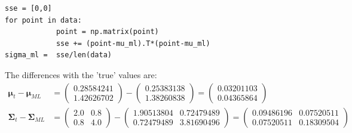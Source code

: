 \documentclass[a4paper,10pt]{article}
\numberwithin{equation}{section} %
\numberwithin{figure}{section} %
\numberwithin{table}{section} %
\theoremstyle{mytheor}
\begin{document}
\begin{enumerate}
\begin{verbatim}
sse = [0,0]
for point in data:
        	point = np.matrix(point)
        	sse += (point-mu_ml).T*(point-mu_ml)
sigma_ml =  sse/len(data)
    		\end{verbatim}
    		The differences with the 'true' values are:
    		\begin{align}
    		\boldsymbol \mu_t - \boldsymbol \mu_{ML} &= \begin{pmatrix} 0.28584241 \\ 1.42626702\end{pmatrix} - \begin{pmatrix} 0.25383138\\ 1.38260838 \end{pmatrix} = \begin{pmatrix} 0.03201103\\ 0.04365864 \end{pmatrix}\\
    		\boldsymbol \Sigma_t - \boldsymbol \Sigma_{ML} &= \begin{pmatrix} 2.0 & 0.8\\ 0.8 & 4.0 \end{pmatrix} - \begin{pmatrix} 1.90513804 & 0.72479489\\ 0.72479489 & 3.81690496 \end{pmatrix} = \begin{pmatrix} 0.09486196 & 0.07520511\\ 0.07520511 & 0.18309504 \end{pmatrix}
		\end{align}
\end{enumerate}
\end{document}
